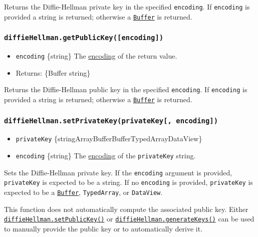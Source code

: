 Returns the Diffie-Hellman private key in the specified
\texttt{encoding}. If \texttt{encoding} is provided a string is
returned; otherwise a \href{buffer.md}{\texttt{Buffer}} is returned.

\subsubsection{\texorpdfstring{\texttt{diffieHellman.getPublicKey({[}encoding{]})}}{diffieHellman.getPublicKey({[}encoding{]})}}\label{diffiehellman.getpublickeyencoding}

\begin{itemize}
\tightlist
\item
  \texttt{encoding} \{string\} The
  \href{buffer.md\#buffers-and-character-encodings}{encoding} of the
  return value.
\item
  Returns: \{Buffer \textbar{} string\}
\end{itemize}

Returns the Diffie-Hellman public key in the specified
\texttt{encoding}. If \texttt{encoding} is provided a string is
returned; otherwise a \href{buffer.md}{\texttt{Buffer}} is returned.

\subsubsection{\texorpdfstring{\texttt{diffieHellman.setPrivateKey(privateKey{[},\ encoding{]})}}{diffieHellman.setPrivateKey(privateKey{[}, encoding{]})}}\label{diffiehellman.setprivatekeyprivatekey-encoding}

\begin{itemize}
\tightlist
\item
  \texttt{privateKey}
  \{string\textbar ArrayBuffer\textbar Buffer\textbar TypedArray\textbar DataView\}
\item
  \texttt{encoding} \{string\} The
  \href{buffer.md\#buffers-and-character-encodings}{encoding} of the
  \texttt{privateKey} string.
\end{itemize}

Sets the Diffie-Hellman private key. If the \texttt{encoding} argument
is provided, \texttt{privateKey} is expected to be a string. If no
\texttt{encoding} is provided, \texttt{privateKey} is expected to be a
\href{buffer.md}{\texttt{Buffer}}, \texttt{TypedArray}, or
\texttt{DataView}.

This function does not automatically compute the associated public key.
Either
\hyperref[diffiehellmansetpublickeypublickey-encoding]{\texttt{diffieHellman.setPublicKey()}}
or
\hyperref[diffiehellmangeneratekeysencoding]{\texttt{diffieHellman.generateKeys()}}
can be used to manually provide the public key or to automatically
derive it.

